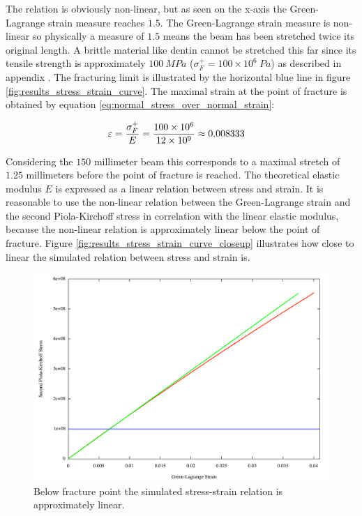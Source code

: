 The relation is obviously non-linear, but as seen on the x-axis the
Green-Lagrange strain measure reaches $1.5$. The Green-Lagrange
strain measure is non-linear so physically a measure of $1.5$ means
the beam has been stretched twice its original length. A brittle material like dentin
cannot be stretched this far since its tensile strength is
approximately $100 \ MPa$ ($\sigma^+_F = 100 \times 10^6 \ Pa$)
as described in appendix . The fracturing limit
is illustrated by the horizontal blue line in figure
\vref{fig:results_stress_strain_curve}. 
The maximal strain at the point of fracture is obtained by equation
\eqref{eq:normal_stress_over_normal_strain}:

\begin{align*}
  \varepsilon &= \frac{\sigma^+_F}{E} \vspace{2mm} 
  = \frac{100 \times 10^6}{12 \times 10^9} \vspace{2mm}
  \approx 0.008333
\end{align*}

Considering the $150$ millimeter beam this corresponds to a maximal
stretch of $1.25$ millimeters before the point of fracture is reached.
%
The theoretical elastic modulus $E$ is expressed as a linear relation between
stress and strain. It is reasonable to use the non-linear relation
between the Green-Lagrange strain and the second Piola-Kirchoff stress
in correlation with the linear elastic modulus, because the non-linear
relation is approximately linear below the point of fracture. Figure
\vref{fig:results_stress_strain_curve_closeup} illustrates how close to
linear the simulated relation between stress and strain is.

\begin{figure}
    \centering
    \includegraphics[width=140mm]{./images/results_ssc_dentine_closeup.pdf}
    \caption{Below fracture point the simulated stress-strain relation
      is approximately linear.}
    \label{fig:results_stress_strain_curve_closeup}
\end{figure}

